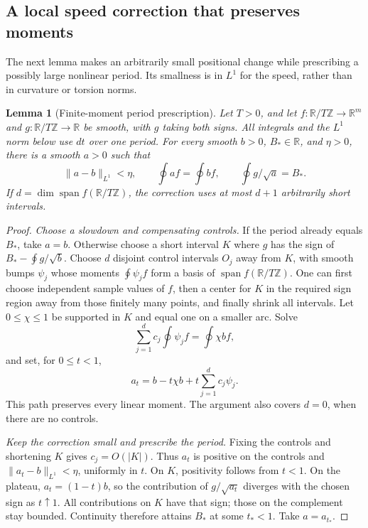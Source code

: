 \documentclass[11pt]{amsart}
\newtheorem{lemma}[theorem]{Lemma}
\theoremstyle{definition}
\theoremstyle{remark}
\newcommand{\R}{\mathbb R}\newcommand{\Sph}{\mathbb S}
\numberwithin{equation}{section}
\begin{document}
\subsection{A local speed correction that preserves moments}
The next lemma makes an arbitrarily small positional change while
prescribing a possibly large nonlinear period. Its smallness is in $L^1$
for the speed, rather than in curvature or torsion norms.
\begin{lemma}[Finite-moment period prescription]\label{lem:finite-moment-balance}
Let $T>0$, and let $f:\R/T\mathbb Z\to\R^m$ and
$g:\R/T\mathbb Z\to\R$ be smooth, with $g$ taking both signs.
All integrals and the $L^1$ norm below use $dt$ over one period.
For every smooth $b>0$, $B_*\in\R$, and $\eta>0$, there is a
smooth $a>0$ such that
\begin{equation}\label{eq:finite-moment-balance}
 \|a-b\|_{L^1}<\eta,\qquad
 \oint af=\oint bf,\qquad \oint g/\sqrt a=B_*.
\end{equation}
If $d=\dim\operatorname{span}f(\R/T\mathbb Z)$, the correction uses at most $d+1$
arbitrarily short intervals.
\end{lemma}
\begin{proof}
\emph{Choose a slowdown and compensating controls.}
If the period already equals $B_*$, take $a=b$. Otherwise choose a short
interval $K$ where $g$ has the sign of $B_*-\oint g/\sqrt b$.
Choose $d$ disjoint control intervals $O_j$ away from $K$, with smooth
bumps $\psi_j$ whose moments $\oint\psi_jf$ form a basis of
$\operatorname{span}f(\R/T\mathbb Z)$. One can first choose independent sample
values of $f$, then a center for $K$ in the required sign region away
from those finitely many points, and finally shrink all intervals.
Let $0\le\chi\le1$ be supported in $K$ and equal one on a smaller arc.
Solve
\[
 \sum_{j=1}^d c_j\oint\psi_jf=\oint\chi bf,
\]
and set, for $0\le t<1$,
\[
 a_t=b-t\chi b+t\sum_{j=1}^d c_j\psi_j.
\]
This path preserves every linear moment. The argument also covers $d=0$,
when there are no controls.

\emph{Keep the correction small and prescribe the period.}
Fixing the controls and shortening $K$ gives $c_j=O(|K|)$. Thus $a_t$
is positive on the controls and $\|a_t-b\|_{L^1}<\eta$, uniformly in
$t$. On $K$, positivity follows from $t<1$. On the plateau,
$a_t=(1-t)b$, so the contribution of $g/\sqrt{a_t}$ diverges with the
chosen sign as $t\uparrow1$. All contributions on $K$ have that sign;
those on the complement stay bounded. Continuity therefore attains $B_*$
at some $t_*<1$. Take $a=a_{t_*}$.
\end{proof}
\end{document}
